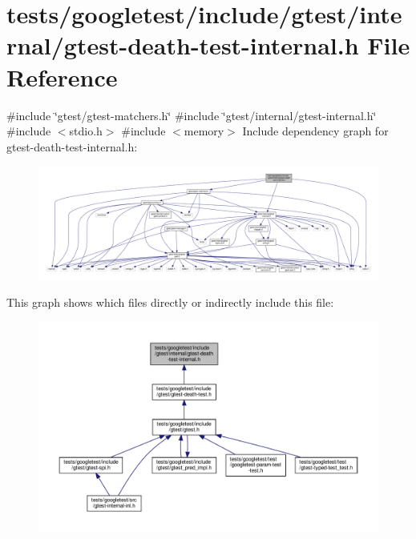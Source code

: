 \hypertarget{gtest-death-test-internal_8h}{}\section{tests/googletest/include/gtest/internal/gtest-\/death-\/test-\/internal.h File Reference}
\label{gtest-death-test-internal_8h}
{\ttfamily \#include \char`\"{}gtest/gtest-\/matchers.\+h\char`\"{}}\newline
{\ttfamily \#include \char`\"{}gtest/internal/gtest-\/internal.\+h\char`\"{}}\newline
{\ttfamily \#include $<$stdio.\+h$>$}\newline
{\ttfamily \#include $<$memory$>$}\newline
Include dependency graph for gtest-\/death-\/test-\/internal.h\+:\nopagebreak
\begin{figure}[H]
\begin{center}
\leavevmode
\includegraphics[width=350pt]{gtest-death-test-internal_8h__incl}
\end{center}
\end{figure}
This graph shows which files directly or indirectly include this file\+:\nopagebreak
\begin{figure}[H]
\begin{center}
\leavevmode
\includegraphics[width=350pt]{gtest-death-test-internal_8h__dep__incl}
\end{center}
\end{figure}
